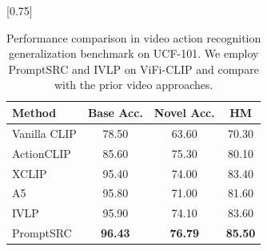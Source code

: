 \begin{table}[t!]
    \small \centering
 \setlength{\tabcolsep}{20pt}
    \scalebox{0.75}[0.75]{
    \begin{tabular}{lccc}
    \toprule
    Method  & Base Acc. & Novel Acc. & HM\\
    \midrule
    Vanilla CLIP  & 78.50 & 63.60  & 70.30 \\
    ActionCLIP &  {85.60 } & {75.30} & {{80.10}}\\
    XCLIP   & 95.40  & 74.00 & 83.40 \\
    A5 &  {95.80  } & {71.00} & {81.60}\\
    \midrule
    IVLP & 95.90 & 74.10 & 83.60 \\
   \rowcolor{tabhighlight}  PromptSRC &  \textbf{96.43 } & \textbf{76.79} & \textbf{85.50}\\
    \bottomrule
    \end{tabular}}\vspace{-0.5em}
    \caption{Performance comparison in video action recognition generalization benchmark on UCF-101. We employ PromptSRC and IVLP on ViFi-CLIP and compare with the prior video approaches.}
    \label{tab_appendix:video_task}
\end{table}